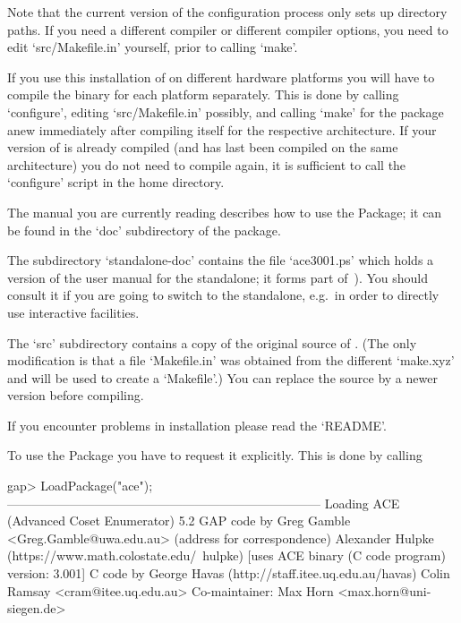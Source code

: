 Note that the  current version of the configuration  process only sets
up  directory paths.  If you  need a  different compiler  or different
compiler options, you need to edit `src/Makefile.in'  yourself,  prior
to calling `make'.

If you use this installation of {\GAP} on different hardware platforms
you will have to compile the binary for each platform separately. This
is done by calling `configure',  editing  `src/Makefile.in'  possibly,
and calling `make' for the package anew  immediately  after  compiling
{\GAP} itself for the respective  architecture.  If  your  version  of
{\GAP} is already compiled (and has last been  compiled  on  the  same
architecture)  you  do  not  need  to  compile  {\GAP}  again,  it  is
sufficient  to  call  the  `configure'  script  in  the  {\GAP}   home
directory.

The manual you are currently reading describes how to use  the  {\ACE}
Package; it can be found in the `doc' subdirectory of the package. %
%
%

The subdirectory `standalone-doc' contains the file `ace3001.ps' which
holds a version of the user manual for the {\ACE} standalone; it forms
part of~\cite{Ram99ace}). You should consult  it  if  you  are  going  to
switch to  the  {\ACE}  standalone,  e.g.~in  order  to  directly  use
interactive facilities.

The  `src' subdirectory  contains a  copy  of the  original source  of
{\ACE}.  (The  only modification  is  that  a  file `Makefile.in'  was
obtained from  the different `make.xyz' and  will be used  to create a
`Makefile'.)  You  can replace  the source by  a newer  version before
compiling.

If you encounter problems in installation please read the `README'.


To use the {\ACE} Package you have  to  request  it  explicitly.
This is done by calling

\beginexample
gap> LoadPackage("ace");
---------------------------------------------------------------------------
Loading    ACE (Advanced Coset Enumerator) 5.2
GAP code by Greg Gamble <Greg.Gamble@uwa.edu.au> (address for correspondence)
       Alexander Hulpke (https://www.math.colostate.edu/~hulpke)
           [uses ACE binary (C code program) version: 3.001]
C code by  George Havas (http://staff.itee.uq.edu.au/havas)
           Colin Ramsay <cram@itee.uq.edu.au>
Co-maintainer: Max Horn <max.horn@uni-siegen.de>

